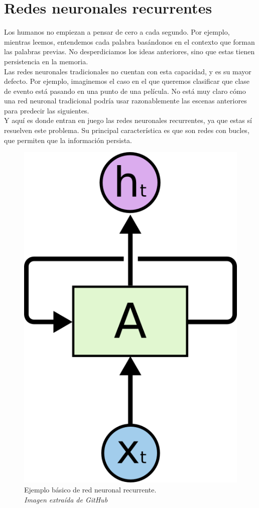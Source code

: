 \section{Redes neuronales recurrentes}
Los humanos no empiezan a pensar de cero a cada segundo. Por ejemplo, mientras leemos, entendemos cada palabra basándonos en el contexto que forman las palabras previas. No desperdiciamos los ideas anteriores, sino que estas tienen persistencia en la memoria.\\
Las redes neuronales tradicionales no cuentan con esta capacidad, y es su mayor defecto. Por ejemplo, imaginemos el caso en el que queremos clasificar que clase de evento está pasando en una punto de una película. No está muy claro cómo una red neuronal tradicional podría usar razonablemente las escenas anteriores para predecir las siguientes.\\
Y aquí es donde entran en juego las redes neuronales recurrentes, ya que estas sí resuelven este problema. Su principal característica es que son redes con bucles, que permiten que la información persista.\\
\begin{figure}[htp]
\centering
\vspace{-1.5em}
\includegraphics[scale=0.3]{images/rnnrolled.png}
\caption{Ejemplo básico de red neuronal recurrente.\\\textit{Imagen extraída de GitHub}}
\end{figure}
